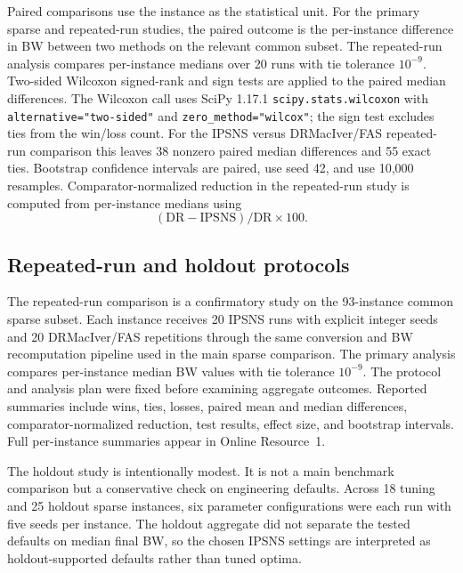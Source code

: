 Paired comparisons use the instance as the statistical unit. For the primary sparse and repeated-run studies, the paired outcome is the per-instance difference in BW between two methods on the relevant common subset. The repeated-run analysis compares per-instance medians over 20 runs with tie tolerance \(10^{-9}\). Two-sided Wilcoxon signed-rank and sign tests are applied to the paired median differences. The Wilcoxon call uses SciPy 1.17.1 \texttt{scipy.stats.wilcoxon} with \texttt{alternative="two-sided"} and \texttt{zero\_method="wilcox"}; the sign test excludes ties from the win/loss count. For the IPSNS versus DRMacIver/FAS repeated-run comparison this leaves 38 nonzero paired median differences and 55 exact ties. Bootstrap confidence intervals are paired, use seed 42, and use 10{,}000 resamples. Comparator-normalized reduction in the repeated-run study is computed from per-instance medians using
\begin{equation}
    (\mathrm{DR}-\mathrm{IPSNS})/\mathrm{DR}\times 100.
    \label{eq:exp10-rel-excess}
\end{equation}

\subsection{Repeated-run and holdout protocols}
\label{subsec:exp10-protocol}

The repeated-run comparison is a confirmatory study on the 93-instance common sparse subset. Each instance receives 20 IPSNS runs with explicit integer seeds and 20 DRMacIver/FAS repetitions through the same conversion and BW recomputation pipeline used in the main sparse comparison. The primary analysis compares per-instance median BW values with tie tolerance \(10^{-9}\). The protocol and analysis plan were fixed before examining aggregate outcomes. Reported summaries include wins, ties, losses, paired mean and median differences, comparator-normalized reduction, test results, effect size, and bootstrap intervals. Full per-instance summaries appear in Online Resource~1.

The holdout study is intentionally modest. It is not a main benchmark comparison but a conservative check on engineering defaults. Across 18 tuning and 25 holdout sparse instances, six parameter configurations were each run with five seeds per instance. The holdout aggregate did not separate the tested defaults on median final BW, so the chosen IPSNS settings are interpreted as holdout-supported defaults rather than tuned optima.

